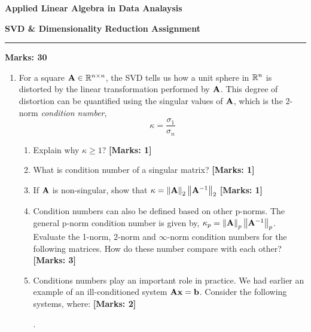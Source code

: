 \documentclass[12pt]{article}
\def\mf{\ensuremath\mathbf}
\def\mb{\ensuremath\mathbb}
\def\lV{\ensuremath\left\lVert}
\def\rV{\ensuremath\right\rVert}
\def\bmx{\ensuremath\begin{bmatrix*}[r]}
\def\emx{\ensuremath\end{bmatrix*}}
\begin{document}
\begin{center}
\begin{large}
\textbf{Applied Linear Algebra in Data Analaysis}\\
\vspace{0.1cm}
\end{large}
\textbf{SVD \& Dimensionality Reduction Assignment}
\end{center}
\hrule
\vspace{1em}

\begin{large}
    \textbf{Marks: 30}
\end{large}

\begin{enumerate}
    \item For a square $\mf{A} \in\mb{R}^{n \times n}$, the SVD tells us how a unit sphere in $\mb{R}^n$ is distorted by the linear transformation performed by $\mf{A}$. This degree of distortion can be quantified using the singular values of $\mf{A}$, which is the 2-norm \textit{condition number},
    \[ \kappa = \frac{\sigma_1}{\sigma_n} \]
    \begin{enumerate}
        \item Explain why $\kappa \geq 1$? \textbf{[Marks: 1]}
        \item What is condition number of a singular matrix? \textbf{[Marks: 1]}
        \item If $\mf{A}$ is non-singular, show that $\kappa = \lV\mf{A}\rV_2\lV\mf{A}^{-1}\rV_2$ \textbf{[Marks: 1]}
        \item Condition numbers can also be defined based on other p-norms. The general p-norm condition number is given by, $\kappa_p = \lV\mf{A}\rV_p\lV\mf{A}^{-1}\rV_p$. Evaluate the 1-norm, 2-norm and $\infty$-norm condition numbers for the following matrices. How do these number compare with each other? \textbf{[Marks: 3]}
        \item Conditions numbers play an important role in practice. We had earlier an example of an ill-conditioned system $\mf{Ax} = \mf{b}$. Consider the following systems, where: \textbf{[Marks: 2]}
        .


\end{enumerate}
\end{enumerate}
\end{document}
